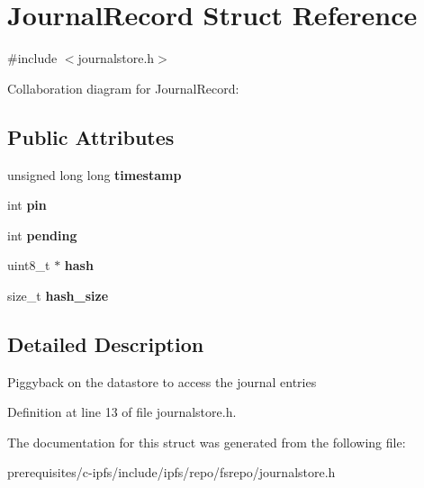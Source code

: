\hypertarget{struct_journal_record}{}\section{Journal\+Record Struct Reference}
\label{struct_journal_record}


{\ttfamily \#include $<$journalstore.\+h$>$}



Collaboration diagram for Journal\+Record\+:
\subsection*{Public Attributes}
\begin{DoxyCompactItemize}
\item 
\mbox{\label{struct_journal_record_a52a6e62933d3f0df76db5e5d67f9a506}} 
unsigned long long {\bfseries timestamp}
\item 
\mbox{\label{struct_journal_record_a9bc233e70822471ee833c14bbc789732}} 
int {\bfseries pin}
\item 
\mbox{\label{struct_journal_record_ac8dc878827331c0ee3f7a9176e2b5f77}} 
int {\bfseries pending}
\item 
\mbox{\label{struct_journal_record_aaa0c97b11bf2dc0d8d6652bf88a591b0}} 
uint8\+\_\+t $\ast$ {\bfseries hash}
\item 
\mbox{\label{struct_journal_record_a8309a57ddf050786ee3bd88789ab46a8}} 
size\+\_\+t {\bfseries hash\+\_\+size}
\end{DoxyCompactItemize}


\subsection{Detailed Description}
Piggyback on the datastore to access the journal entries 

Definition at line 13 of file journalstore.\+h.



The documentation for this struct was generated from the following file\+:\begin{DoxyCompactItemize}
\item 
prerequisites/c-\/ipfs/include/ipfs/repo/fsrepo/journalstore.\+h\end{DoxyCompactItemize}
